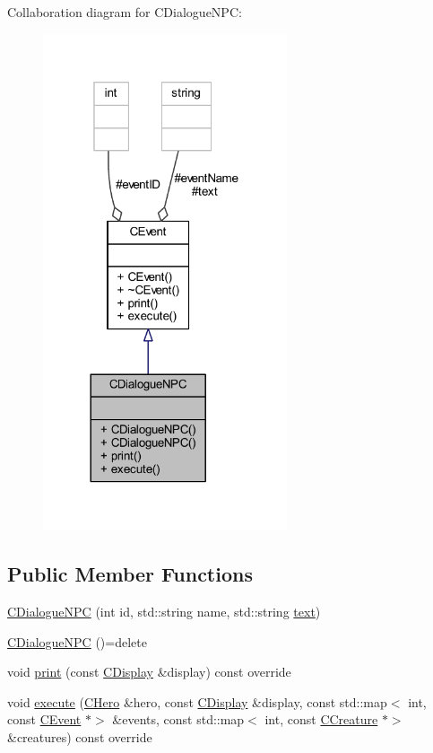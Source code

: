 Collaboration diagram for C\+Dialogue\+N\+PC\+:\nopagebreak
\begin{figure}[H]
\begin{center}
\leavevmode
\includegraphics[width=204pt]{class_c_dialogue_n_p_c__coll__graph}
\end{center}
\end{figure}
\subsection*{Public Member Functions}
\begin{DoxyCompactItemize}
\item 
\mbox{\hyperlink{class_c_dialogue_n_p_c_ab82af9d65b0aaeb41b6b984c4cdc8d12}{C\+Dialogue\+N\+PC}} (int id, std\+::string name, std\+::string \mbox{\hyperlink{class_c_event_a0126916c81d39bf5a4bcd18da90b7c61}{text}})
\item 
\mbox{\hyperlink{class_c_dialogue_n_p_c_a253c1a8596841ac58e915bc9b7947e3b}{C\+Dialogue\+N\+PC}} ()=delete
\item 
void \mbox{\hyperlink{class_c_dialogue_n_p_c_a1deb79509daa19585916a308c9b42e9c}{print}} (const \mbox{\hyperlink{class_c_display}{C\+Display}} \&display) const override
\item 
void \mbox{\hyperlink{class_c_dialogue_n_p_c_a6a7d83e9c13789f6804a8b5323d572f8}{execute}} (\mbox{\hyperlink{class_c_hero}{C\+Hero}} \&hero, const \mbox{\hyperlink{class_c_display}{C\+Display}} \&display, const std\+::map$<$ int, const \mbox{\hyperlink{class_c_event}{C\+Event}} $\ast$$>$ \&events, const std\+::map$<$ int, const \mbox{\hyperlink{class_c_creature}{C\+Creature}} $\ast$$>$ \&creatures) const override
\end{DoxyCompactItemize}
